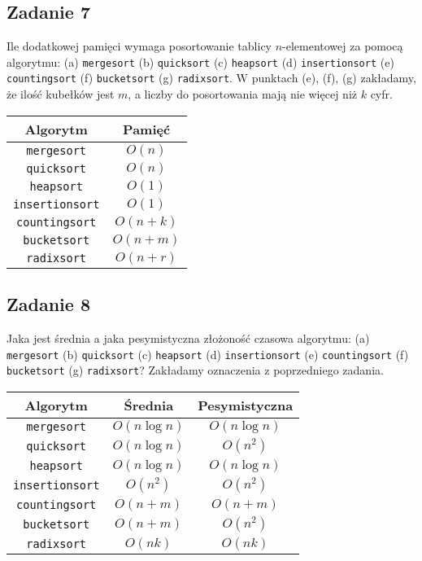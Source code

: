 \documentclass{article}
\begin{document}
\subsection*{Zadanie 7}
Ile dodatkowej pamięci wymaga posortowanie tablicy $n$-elementowej za pomocą
algorytmu: (a) \verb+mergesort+ (b) \verb+quicksort+ (c) \verb+heapsort+ (d) \verb+insertionsort+ (e) \verb+countingsort+
(f) \verb+bucketsort+ (g) \verb+radixsort+. W punktach (e), (f), (g) zakładamy, że ilość kubełków
jest $m$, a liczby do posortowania mają nie więcej niż $k$ cyfr.
\begin{center}
    \begin{tabular}{c c}
        \textbf{Algorytm}    & \textbf{Pamięć} \\
        \hline
        \verb+mergesort+     & $O(n)$          \\
        \verb+quicksort+     & $O(n)$          \\
        \verb+heapsort+      & $O(1)$          \\
        \verb+insertionsort+ & $O(1)$          \\
        \verb+countingsort+  & $O(n+k)$        \\
        \verb+bucketsort+    & $O(n+m)$        \\
        \verb+radixsort+     & $O(n+r)$
    \end{tabular}
\end{center}

\subsection*{Zadanie 8}
Jaka jest średnia a jaka pesymistyczna złożoność czasowa algorytmu: (a) \verb+mergesort+ (b) \verb+quicksort+
(c) \verb+heapsort+ (d) \verb+insertionsort+ (e) \verb+countingsort+ (f) \verb+bucketsort+ (g) \verb+radixsort+?
Zakładamy oznaczenia z poprzedniego zadania.
\begin{center}
    \begin{tabular}{c c c}
        \textbf{Algorytm}    & \textbf{Średnia} & \textbf{Pesymistyczna} \\
        \hline
        \verb+mergesort+     & $O(n \log n)$    & $O(n \log n)$          \\
        \verb+quicksort+     & $O(n \log n)$    & $O(n^2)$               \\
        \verb+heapsort+      & $O(n \log n)$    & $O(n \log n)$          \\
        \verb+insertionsort+ & $O(n^2)$         & $O(n^2)$               \\
        \verb+countingsort+  & $O(n+m)$         & $O(n+m)$               \\
        \verb+bucketsort+    & $O(n+m)$         & $O(n^2)$               \\
        \verb+radixsort+     & $O(nk)$          & $O(nk)$
    \end{tabular}
\end{center}
\end{document}
